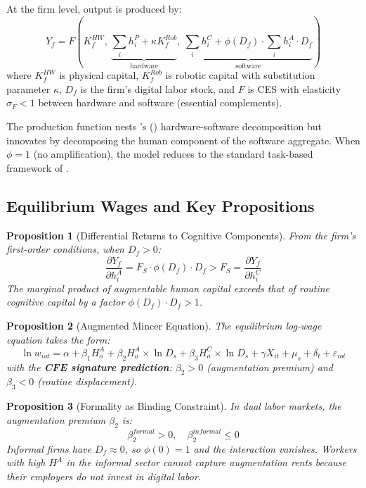 \documentclass[a4paper,fleqn]{cas-dc}
\newtheorem{proposition}{Proposition}
\begin{document}
At the firm level, output is produced by:
\begin{equation}
Y_f = F\left(K_f^{HW},\ \underbrace{\textstyle\sum_i h_i^P + \kappa K_f^{Rob}}_{\text{hardware}},\ \underbrace{\textstyle\sum_i h_i^C + \phi(D_f) \cdot \sum_i h_i^A \cdot D_f}_{\text{software}}\right)
\label{eq:production}
\end{equation}
where $K_f^{HW}$ is physical capital, $K_f^{Rob}$ is robotic capital with substitution parameter $\kappa$, $D_f$ is the firm's digital labor stock, and $F$ is CES with elasticity $\sigma_F < 1$ between hardware and software (essential complements).

The production function nests \citeauthor{growiec2024hardware}'s (\citeyear{growiec2024hardware}) hardware-software decomposition but innovates by decomposing the human component of the software aggregate. When $\phi = 1$ (no amplification), the model reduces to the standard task-based framework of \citet{acemoglu2018race}.

\subsection{Equilibrium Wages and Key Propositions}

\begin{proposition}[Differential Returns to Cognitive Components]
\label{prop:returns}
From the firm's first-order conditions, when $D_f > 0$:
\begin{equation}
\frac{\partial Y_f}{\partial h_i^A} = F_S \cdot \phi(D_f) \cdot D_f > F_S = \frac{\partial Y_f}{\partial h_i^C}
\end{equation}
The marginal product of augmentable human capital exceeds that of routine cognitive capital by a factor $\phi(D_f) \cdot D_f > 1$.
\end{proposition}

\begin{proposition}[Augmented Mincer Equation]
\label{prop:mincer}
The equilibrium log-wage equation takes the form:
\begin{equation}
\ln w_{iot} = \alpha + \beta_1 H_o^A + \beta_2 H_o^A \times \ln D_{s} + \beta_3 H_o^C \times \ln D_{s} + \gamma X_{it} + \mu_s + \delta_t + \varepsilon_{iot}
\label{eq:mincer}
\end{equation}
with the \textbf{CFE signature prediction}: $\beta_2 > 0$ (augmentation premium) and $\beta_3 < 0$ (routine displacement).
\end{proposition}

\begin{proposition}[Formality as Binding Constraint]
\label{prop:formality}
In dual labor markets, the augmentation premium $\beta_2$ is:
\begin{equation}
\beta_2^{formal} > 0, \quad \beta_2^{informal} \leq 0
\end{equation}
Informal firms have $D_f \approx 0$, so $\phi(0) = 1$ and the interaction vanishes. Workers with high $H^A$ in the informal sector cannot capture augmentation rents because their employers do not invest in digital labor.
\end{proposition}
\end{document}
